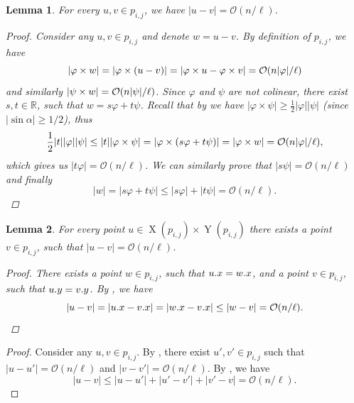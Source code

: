 \documentclass[11pt]{article}
\renewcommand{\O}{\mathcal{O}}
\renewcommand{\phi}{\varphi}
\theoremstyle{plain}
\newtheorem{lemma}{Lemma}
\theoremstyle{definition}
\theoremstyle{remark}
\DeclareMathOperator*{\X}{X}
\DeclareMathOperator*{\Y}{Y}
\begin{document}
\begin{lemma}\label{distance_bound_aux}
	For every $u, v \in p_{i, j}$, we have $|u - v| = \O(n / \ell)$.
	\begin{proof}
		Consider any $u, v \in p_{i, j}$ and denote $w = u - v$.
		By definition of $p_{i, j}$, we have
		\[ |\h{w}| = |\h{(u - v)}| = |\h{u} - \h{v}| = \O(n|\phi| / \ell) \]
		and similarly $|\s{w}| = \O(n|\psi| / \ell)$.
		Since $\phi$ and $\psi$ are not colinear, there exist $s, t \in \mathbb{R}$, such that $w = s\phi + t\psi$.
		Recall that by  we have $|\phi \times \psi| \ge \frac{1}{2}|\phi||\psi|$ (since $|\sin \alpha| \ge 1/2$), thus
		\[ \frac{1}{2}|t||\phi||\psi| \le |t||\phi \times \psi| = |\phi \times (s\phi + t\psi)| = |\h{w}| = \O(n|\phi| / \ell), \]
		which gives us $|t\phi| = \O(n / \ell)$.
		We can similarly prove that $|s\psi| = \O(n / \ell)$ and finally
		\[ |w| = |s\phi + t\psi| \le |s\phi| + |t\psi| = \O(n / \ell). \]
	\end{proof}
\end{lemma}

\begin{lemma}\label{distance_bound_aux2}
	For every point $u \in \X(p_{i, j}) \times \Y(p_{i, j})$ there exists a point $v \in p_{i, j}$, such that $|u - v| = \O(n / \ell)$.
	\begin{proof}
		There exists a point $w \in p_{i, j}$, such that $u.x = w.x$, and a point $v \in p_{i, j}$, such that $u.y = v.y$.
		By , we have
		\[|u - v| = |\x{u} - \x{v}| = |\x{w} - \x{v}| \le |w - v| = \O(n / \ell).\] 
	\end{proof}
\end{lemma}

\DistanceBoundLemma
\begin{proof}
	Consider any $u, v \in p_{i, j}$.
	By , there exist $u', v' \in p_{i, j}$ such that $|u - u'| = \O(n / \ell)$ and $|v - v'| = \O(n / \ell)$.
	By , we have
	\[ |u - v| \le |u - u'| + |u' - v'| + |v' - v| = \O(n / \ell). \]
\end{proof}



\end{document}
